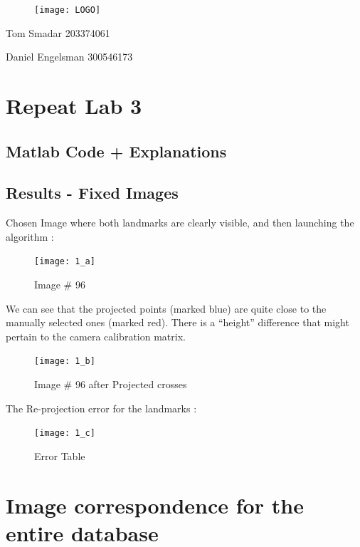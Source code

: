 \documentclass[a4paper]{article}
\begin{document}
 

\begin{figure}[H]
\centering
\texttt{[image: LOGO]}
\end{figure} 

\begin{center}\begin{Large}

Tom Smadar 203374061

Daniel Engelsman 300546173
\end{Large} \end{center}


\section{Repeat Lab 3}

\subsection{Matlab Code + Explanations}


\newpage

\subsection{Results - Fixed Images}
Chosen Image where both landmarks are clearly visible, and then launching the algorithm :
\begin{figure}[H]
\centering
\texttt{[image: 1\_a]}
\caption{Image $\#$ 96} 
\end{figure}

We can see that the projected points (marked blue) are quite close to the manually selected ones (marked red). There is a “height” difference that might pertain to the camera calibration matrix.

\begin{figure}[H]
\centering
\texttt{[image: 1\_b]}
\caption{Image $\#$ 96 after Projected crosses }
\end{figure}

The Re-projection error for the landmarks :
\begin{figure}[H]
\centering
\texttt{[image: 1\_c]}
\caption{Error Table} 
\end{figure}
\newpage

\section{Image correspondence for the entire database}
\end{document}
